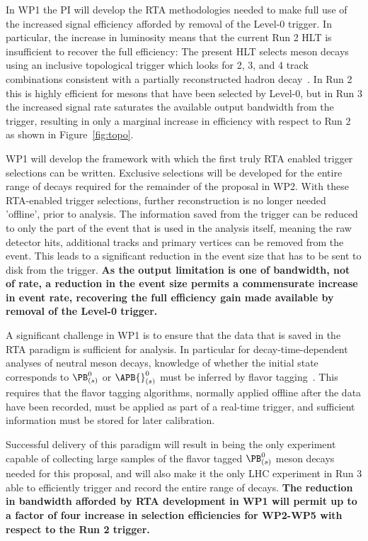 \documentclass[11pt,a4paper]{article}
\begin{document}
In WP1 the PI will develop the RTA methodologies needed to make full use of the increased signal efficiency afforded by removal of the Level-0 trigger. In particular, the increase in luminosity means that the current Run 2 HLT is insufficient to recover the full efficiency: The present HLT selects \PB meson decays using an inclusive topological trigger which looks for 2, 3, and 4 track combinations consistent with a partially reconstructed \Pqb hadron  decay~\cite{Gligorov:1384380}. In Run 2 this is highly efficient for \PB mesons that have been selected by Level-0, but in Run 3 the increased signal rate saturates the available output bandwidth from the trigger, resulting in only a marginal increase in efficiency with respect to Run 2 as shown in Figure~\ref{fig:topo}. 

WP1 will develop the framework with which the first truly RTA enabled trigger selections can be written. Exclusive selections will be developed for the entire range of  decays required for the remainder of the proposal in WP2. 
With these RTA-enabled trigger selections, further reconstruction is no longer needed 'offline', prior to analysis. The information saved from the trigger can be reduced to only the part of the event that is used in the analysis itself, meaning the raw detector hits, additional tracks and primary vertices can be removed from the event. This leads to a significant reduction in the event size that has to be sent to disk from the trigger. {\bf{As the output limitation is one of bandwidth, not of rate, a reduction in the event size permits a commensurate increase in event rate, recovering the full efficiency gain made available by removal of the Level-0 trigger.}}

A significant challenge in WP1 is to ensure that the data that is saved in the RTA paradigm is sufficient for analysis. In particular for decay-time-dependent analyses of neutral \PB meson decays, knowledge of whether the initial state corresponds to $\PB^{0}_{(s)}$ or  $\APB{}^{0}_{(s)}$ must be inferred by flavor tagging~\cite{Aaij:2012mu}. This requires that the flavor tagging algorithms, normally applied offline after the data have been recorded, must be applied as part of a real-time trigger, and sufficient information must be stored for later calibration.


Successful delivery of this paradigm will result in \LHCb being the only experiment capable of collecting large samples of the flavor tagged $\PB^{0}_{(s)}$ meson decays needed for this proposal, and will also make it the only LHC experiment in Run 3 able to efficiently trigger and record the entire range of  decays. \textbf{The reduction in bandwidth afforded by RTA development in WP1 will permit up to a factor of four increase in selection efficiencies for WP2-WP5 with respect to the Run 2 trigger.}
\end{document}
